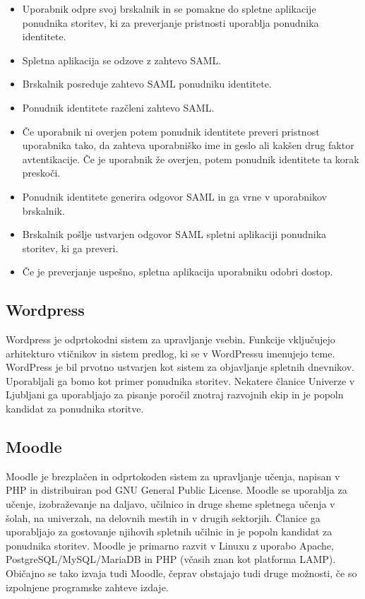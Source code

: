 \documentclass[a4paper,12pt,openright]{book}
\begin{document}
\begin{itemize}
    \item Uporabnik odpre svoj brskalnik in se pomakne do spletne aplikacije ponudnika storitev, ki za preverjanje pristnosti uporablja ponudnika identitete.
    \item Spletna aplikacija se odzove z zahtevo SAML.
    \item Brskalnik posreduje zahtevo SAML ponudniku identitete.
    \item Ponudnik identitete razčleni zahtevo SAML.
    \item Če uporabnik ni overjen potem ponudnik identitete preveri pristnost uporabnika tako, da zahteva uporabniško ime in geslo ali kakšen drug faktor avtentikacije. Če je uporabnik že overjen, potem ponudnik identitete ta korak preskoči.
    \item Ponudnik identitete generira odgovor SAML in ga vrne v uporabnikov brskalnik.
    \item Brskalnik pošlje ustvarjen odgovor SAML spletni aplikaciji ponudnika storitev, ki ga preveri.
    \item Če je preverjanje uspešno, spletna aplikacija uporabniku odobri dostop.
\end{itemize}
\subsection{Wordpress}
Wordpress\cite{wordpress} je odprtokodni sistem za upravljanje vsebin. Funkcije vključujejo arhitekturo vtičnikov in sistem predlog, ki se v WordPressu imenujejo teme. WordPress je bil prvotno ustvarjen kot sistem za objavljanje spletnih dnevnikov.
\newline
Uporabljali ga bomo kot primer ponudnika storitev. Nekatere članice Univerze v Ljubljani ga uporabljajo za pisanje poročil znotraj razvojnih ekip in je popoln kandidat za ponudnika storitve. 
\subsection{Moodle}
Moodle\cite{Moodle} je brezplačen in odprtokoden sistem za upravljanje učenja, napisan v PHP in distribuiran pod GNU General Public License. Moodle se uporablja za učenje, izobraževanje na daljavo, učilnico in druge sheme spletnega učenja v šolah, na univerzah, na delovnih mestih in v drugih sektorjih.
\newline
Članice ga uporabljajo za gostovanje njihovih spletnih učilnic in je popoln kandidat za ponudnika storitev.
Moodle je primarno razvit v Linuxu z uporabo Apache, PostgreSQL/MySQL/MariaDB in PHP (včasih znan kot platforma LAMP). Običajno se tako izvaja tudi Moodle, čeprav obstajajo tudi druge možnosti, če so izpolnjene programske zahteve izdaje.
\end{document}
